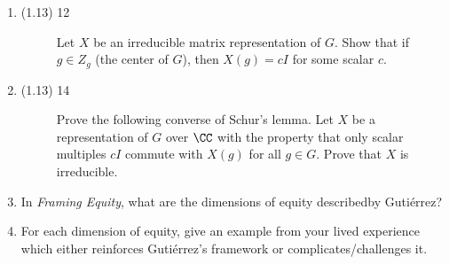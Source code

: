\documentclass{math174}
\date{Wednesday, February 20}
\author{}
\begin{document}
\begin{enumerate}
\item
  \begin{description}
  \item[(1.13) 12] Let \(X\) be an irreducible matrix representation
    of \(G\).  Show that if \(g \in Z_g\) (the center of \(G\)), then
    \(X(g) = cI\) for some scalar \(c.\)

    \begin{solution}

    \end{solution}
  \end{description}
\item
  \begin{description}
  \item[(1.13) 14] Prove the following converse of Schur's lemma.  Let
    \(X\) be a representation of \(G\) over \(\CC\) with the property
    that only scalar multiples \(cI\) commute with \(X(g)\) for all
    \(g \in G\).  Prove that \(X\) is irreducible.

    \begin{solution}

    \end{solution}
  \end{description}
\item In \textit{Framing Equity}, what are the dimensions of equity
  describedby Guti\'errez?

  \begin{solution}

  \end{solution}

\item For each dimension of equity, give an example from your lived
  experience which either reinforces Guti\'errez's framework or
  complicates/challenges it.

  \begin{solution}

  \end{solution}
\end{enumerate}
\end{document}
